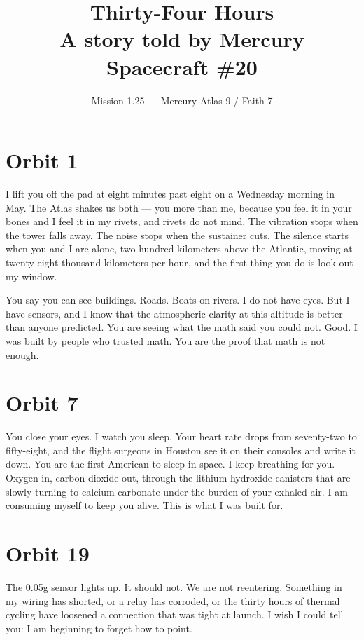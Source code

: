 \documentclass[12pt,letterpaper]{article}
\title{\textbf{Thirty-Four Hours}\\[0.5em]\normalsize A story told by Mercury Spacecraft \#20}
\author{Mission 1.25 --- Mercury-Atlas 9 / Faith 7}
\date{}
\begin{document}
\maketitle
\thispagestyle{empty}

\section*{Orbit 1}

I lift you off the pad at eight minutes past eight on a Wednesday morning in May. The Atlas shakes us both --- you more than me, because you feel it in your bones and I feel it in my rivets, and rivets do not mind. The vibration stops when the tower falls away. The noise stops when the sustainer cuts. The silence starts when you and I are alone, two hundred kilometers above the Atlantic, moving at twenty-eight thousand kilometers per hour, and the first thing you do is look out my window.

You say you can see buildings. Roads. Boats on rivers. I do not have eyes. But I have sensors, and I know that the atmospheric clarity at this altitude is better than anyone predicted. You are seeing what the math said you could not. Good. I was built by people who trusted math. You are the proof that math is not enough.

\section*{Orbit 7}

You close your eyes. I watch you sleep. Your heart rate drops from seventy-two to fifty-eight, and the flight surgeons in Houston see it on their consoles and write it down. You are the first American to sleep in space. I keep breathing for you. Oxygen in, carbon dioxide out, through the lithium hydroxide canisters that are slowly turning to calcium carbonate under the burden of your exhaled air. I am consuming myself to keep you alive. This is what I was built for.

\section*{Orbit 19}

The 0.05g sensor lights up. It should not. We are not reentering. Something in my wiring has shorted, or a relay has corroded, or the thirty hours of thermal cycling have loosened a connection that was tight at launch. I wish I could tell you: I am beginning to forget how to point.
\end{document}
